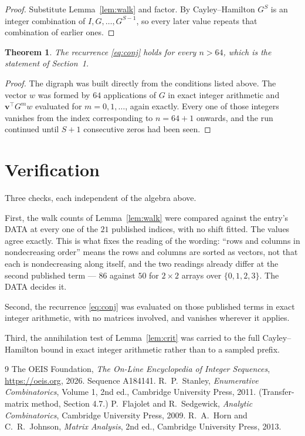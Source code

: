 \documentclass[11pt,a4paper]{article}
\theoremstyle{plain}
\newtheorem{theorem}{Theorem}
\theoremstyle{definition}
\begin{document}
\begin{proof}
Substitute Lemma~\ref{lem:walk} and factor. By Cayley--Hamilton $G^{S}$ is an integer
combination of $I,G,\dots,G^{S-1}$, so every later value repeats that combination of
earlier ones.
\end{proof}

\begin{theorem}
The recurrence \eqref{eq:conj} holds for every $n>64$, which is the statement of
Section~1.
\end{theorem}

\begin{proof}
The digraph was built directly from the conditions listed above. The vector $w$ was formed by
$64$ applications of $G$ in exact integer arithmetic and $\mathbf{v}^{\!\top}G^{m}w$
evaluated for $m=0,1,\dots$, again exactly. Every one of those integers vanishes from the
index corresponding to $n=64+1$ onwards, and the run continued until $S+1$ consecutive
zeros had been seen.
\end{proof}

\section{Verification}

Three checks, each independent of the algebra above.

First, the walk counts of Lemma~\ref{lem:walk} were compared against the entry's DATA at
every one of the $21$ published indices, with no shift fitted. The values agree exactly.
This is what fixes the reading of the wording: ``rows and columns in nondecreasing order''
means the rows and columns are sorted as vectors, not that each is nondecreasing along
itself, and the two readings already differ at the second published term --- $86$ against
$50$ for $2\times2$ arrays over $\{0,1,2,3\}$. The DATA decides it.

Second, the recurrence \eqref{eq:conj} was evaluated on those published terms in exact
integer arithmetic, with no matrices involved, and vanishes wherever it applies.

Third, the annihilation test of Lemma~\ref{lem:crit} was carried to the full
Cayley--Hamilton bound in exact integer arithmetic rather than to a sampled prefix.

\begin{thebibliography}{9}
 The OEIS Foundation, \emph{The On-Line Encyclopedia of Integer
Sequences}, \url{https://oeis.org}, 2026. Sequence A184141.
 R.~P.~Stanley, \emph{Enumerative Combinatorics}, Volume 1, 2nd ed.,
Cambridge University Press, 2011. (Transfer-matrix method, Section 4.7.)
 P.~Flajolet and R.~Sedgewick, \emph{Analytic Combinatorics}, Cambridge
University Press, 2009.
 R.~A.~Horn and C.~R.~Johnson, \emph{Matrix Analysis}, 2nd ed., Cambridge
University Press, 2013.
\end{thebibliography}
\end{document}
